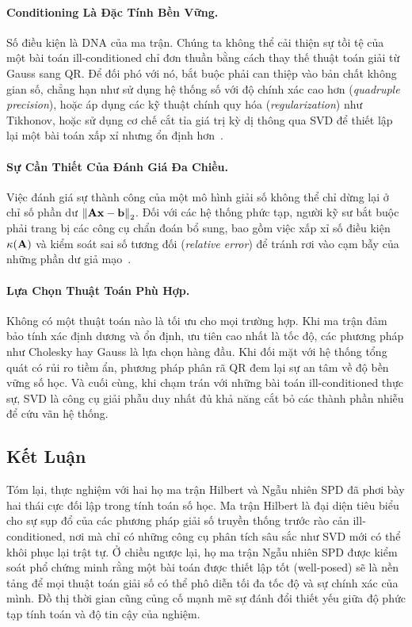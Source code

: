 \paragraph*{Conditioning Là Đặc Tính Bền Vững.}
Số điều kiện là DNA của ma trận. Chúng ta không thể cải thiện sự tồi tệ của một bài toán ill-conditioned chỉ đơn thuần bằng cách thay thế thuật toán giải từ Gauss sang QR. Để đối phó với nó, bắt buộc phải can thiệp vào bản chất không gian số, chẳng hạn như sử dụng hệ thống số với độ chính xác cao hơn (\textit{quadruple precision}), hoặc áp dụng các kỹ thuật chính quy hóa (\textit{regularization}) như Tikhonov, hoặc sử dụng cơ chế cắt tỉa giá trị kỳ dị thông qua SVD để thiết lập lại một bài toán xấp xỉ nhưng ổn định hơn~\cite{golub2013}.

\paragraph*{Sự Cần Thiết Của Đánh Giá Đa Chiều.}
Việc đánh giá sự thành công của một mô hình giải số không thể chỉ dừng lại ở chỉ số phần dư $\left\lVert\mathbf{A}\mathbf{x} - \mathbf{b}\right\rVert_2$. Đối với các hệ thống phức tạp, người kỹ sư bắt buộc phải trang bị các công cụ chẩn đoán bổ sung, bao gồm việc xấp xỉ số điều kiện $\kappa(\mathbf{A})$ và kiểm soát sai số tương đối (\textit{relative error}) để tránh rơi vào cạm bẫy của những phần dư giả mạo~\cite{demmel1997}.

\paragraph*{Lựa Chọn Thuật Toán Phù Hợp.}
Không có một thuật toán nào là tối ưu cho mọi trường hợp. Khi ma trận đảm bảo tính xác định dương và ổn định, ưu tiên cao nhất là tốc độ, các phương pháp như Cholesky hay Gauss là lựa chọn hàng đầu. Khi đối mặt với hệ thống tổng quát có rủi ro tiềm ẩn, phương pháp phân rã QR đem lại sự an tâm về độ bền vững số học. Và cuối cùng, khi chạm trán với những bài toán ill-conditioned thực sự, SVD là công cụ giải phẫu duy nhất đủ khả năng cắt bỏ các thành phần nhiễu để cứu vãn hệ thống.

\subsection{Kết Luận}

Tóm lại, thực nghiệm với hai họ ma trận Hilbert và Ngẫu nhiên SPD đã phơi bày hai thái cực đối lập trong tính toán số học. Ma trận Hilbert là đại diện tiêu biểu cho sự sụp đổ của các phương pháp giải số truyền thống trước rào cản ill-conditioned, nơi mà chỉ có những công cụ phân tích sâu sắc như SVD mới có thể khôi phục lại trật tự. Ở chiều ngược lại, họ ma trận Ngẫu nhiên SPD được kiểm soát phổ chứng minh rằng một bài toán được thiết lập tốt (well-posed) sẽ là nền tảng để mọi thuật toán giải số có thể phô diễn tối đa tốc độ và sự chính xác của mình. Đồ thị thời gian cũng củng cố mạnh mẽ sự đánh đổi thiết yếu giữa độ phức tạp tính toán và độ tin cậy của nghiệm.

